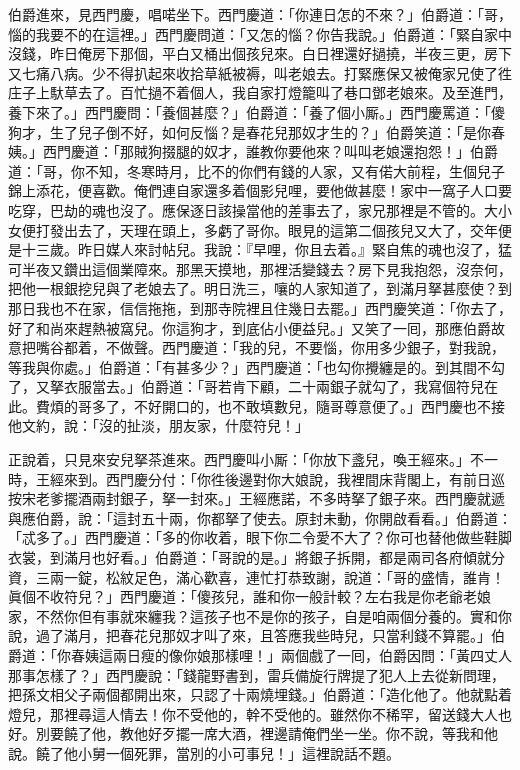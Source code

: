 伯爵進來，見西門慶，唱喏坐下。西門慶道：「你連日怎的不來？」伯爵道：「哥，惱的我要不的在這裡。」西門慶問道：「又怎的惱？你告我說。」伯爵道：「緊自家中沒錢，昨日俺房下那個，平白又桶出個孩兒來。白日裡還好撾撓，半夜三更，房下又七痛八病。少不得扒起來收拾草紙被褥，叫老娘去。打緊應保又被俺家兄使了徃庄子上馱草去了。百忙撾不着個人，我自家打燈籠叫了巷口鄧老娘來。及至進門，養下來了。」西門慶問：「養個甚麼？」伯爵道：「養了個小厮。」西門慶罵道：「傻狗才，生了兒子倒不好，如何反惱？是春花兒那奴才生的？」伯爵笑道：「是你春姨。」西門慶道：「那賊狗掇腿的奴才，誰教你要他來？叫叫老娘還抱怨！」伯爵道：「哥，你不知，冬寒時月，比不的你們有錢的人家，又有偌大前程，生個兒子錦上添花，便喜歡。俺們連自家還多着個影兒哩，要他做甚麼！家中一窩子人口要吃穿，巴劫的魂也沒了。應保逐日該操當他的差事去了，家兄那裡是不管的。大小女便打發出去了，天理在頭上，多虧了哥你。{}眼見的這第二個孩兒又大了，交年便是十三歲。昨日媒人來討帖兒。我說：『早哩，你且去着。』緊自焦的魂也沒了，猛可半夜又鑽出這個業障來。那黑天摸地，那裡活變錢去？房下見我抱怨，沒奈何，把他一根銀挖兒與了老娘去了。{}明日洗三，嚷的人家知道了，到滿月拏甚麼使？到那日我也不在家，信信拖拖，到那寺院裡且住幾日去罷。」{}西門慶笑道：「你去了，好了和尚來趕熱被窩兒。你這狗才，到底佔小便益兒。」又笑了一囘，那應伯爵故意把嘴谷都着，{}不做聲。{}西門慶道：「我的兒，不要惱，你用多少銀子，對我說，等我與你處。」伯爵道：「有甚多少？」西門慶道：「也勾你攪纏是的。到其間不勾了，又拏衣服當去。」伯爵道：「哥若肯下顧，二十兩銀子就勾了，我寫個符兒在此。費煩的哥多了，不好開口的，也不敢填數兒，隨哥尊意便了。」西門慶也不接他文約，說：「沒的扯淡，朋友家，什麼符兒！」

正說着，只見來安兒拏茶進來。西門慶叫小厮：「你放下盞兒，喚王經來。」不一時，王經來到。西門慶分付：「你徃後邊對你大娘說，我裡間床背閣上，有前日巡按宋老爹擺酒兩封銀子，拏一封來。」王經應諾，不多時拏了銀子來。西門慶就遞與應伯爵，說：「這封五十兩，你都拏了使去。{}原封未動，你開啟看看。」伯爵道：「忒多了。」西門慶道：「多的你收着，眼下你二令愛不大了？你可也替他做些鞋脚衣裳，到滿月也好看。」伯爵道：「哥說的是。」將銀子拆開，都是兩司各府傾就分資，三兩一錠，松紋足色，滿心歡喜，連忙打恭致謝，說道：「哥的盛情，誰肯！眞個不收符兒？」西門慶道：「傻孩兒，誰和你一般計較？左右我是你老爺老娘家，不然你但有事就來纏我？這孩子也不是你的孩子，自是咱兩個分養的。實和你說，過了滿月，把春花兒那奴才叫了來，且答應我些時兒，只當利錢不算罷。」伯爵道：「你春姨這兩日瘦的像你娘那樣哩！」兩個戲了一囘，伯爵因問：「黃四丈人那事怎樣了？」西門慶說：「錢龍野書到，雷兵備旋行牌提了犯人上去從新問理，把孫文相父子兩個都開出來，只認了十兩燒埋錢。」伯爵道：「造化他了。他就點着燈兒，那裡尋這人情去！你不受他的，幹不受他的。雖然你不稀罕，留送錢大人也好。別要饒了他，教他好歹擺一席大酒，裡邊請俺們坐一坐。你不說，等我和他說。饒了他小舅一個死罪，當別的小可事兒！」這裡說話不題。

